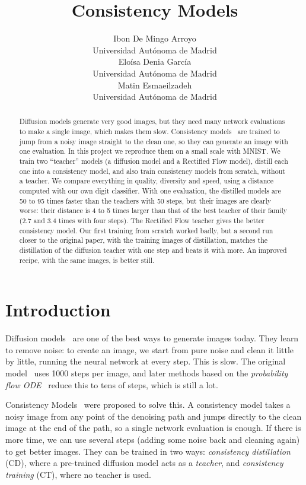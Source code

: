 \documentclass{article}
\title{Consistency Models}
\author{
Ibon De Mingo Arroyo \\
Universidad Autónoma de Madrid \\
\And
Eloísa Denia García \\
Universidad Autónoma de Madrid \\
\And
Matin Esmaeilzadeh \\
Universidad Autónoma de Madrid \\
}
\begin{document}
\maketitle

\begin{abstract}
Diffusion models generate very good images, but they need many network
evaluations to make a single image, which makes them slow. Consistency
models~\cite{song2023consistency} are trained to jump from a noisy image
straight to the clean one, so they can generate an image with one evaluation.
In this project we reproduce them on a small scale with MNIST. We train two
``teacher'' models (a diffusion model and a Rectified Flow model), distill each
one into a consistency model, and also train consistency models from scratch,
without a teacher. We compare everything in quality, diversity and speed, using
a distance computed with our own digit classifier. With one evaluation, the
distilled models are 50 to 95 times faster than the teachers with 50 steps, but
their images are clearly worse: their distance is 4 to 5 times larger than that
of the best teacher of their family (2.7 and 3.4 times with four steps). The
Rectified Flow teacher gives the better consistency model. Our first training
from scratch worked badly, but a second run closer to the original paper, with
the training images of distillation, matches the distillation of the diffusion
teacher with one step and beats it with more. An improved recipe, with the
same images, is better still.
\end{abstract}

\section{Introduction}
\label{sec:introduction}

Diffusion models~\cite{ho2020ddpm,song2021sde} are one of the best ways to
generate images today. They learn to remove noise: to create an image, we start
from pure noise and clean it little by little, running the neural network at
every step. This is slow. The original model~\cite{ho2020ddpm} uses 1000 steps
per image, and later methods based on the \emph{probability flow
ODE}~\cite{song2021sde} reduce this to tens of steps, which is still a lot.

Consistency Models~\cite{song2023consistency} were proposed to solve this. A
consistency model takes a noisy image from any point of the denoising path and
jumps directly to the clean image at the end of the path, so a single network
evaluation is enough. If there is more time, we can use several steps (adding
some noise back and cleaning again) to get better images. They can be trained in
two ways: \emph{consistency distillation} (CD), where a pre-trained diffusion
model acts as a \emph{teacher}, and \emph{consistency training} (CT), where no
teacher is used.
\end{document}
